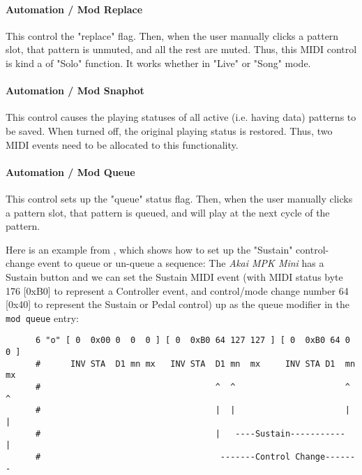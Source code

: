 \paragraph{Automation / Mod Replace}
\label{paragraph:configuration_midi_ctrl_modrep}

   This control the "replace" flag.
   Then, when the user manually clicks a pattern slot,
   that pattern is unmuted, and all the rest are muted.
   Thus, this MIDI control is kind a of "Solo" function.
   It works whether in "Live" or "Song" mode.

\paragraph{Automation / Mod Snaphot}
\label{paragraph:configuration_midi_ctrl_modsnap}

   This control causes the playing statuses of all active
   (i.e. having data) patterns to be saved.  When turned off, the
   original playing status is restored.  Thus, two MIDI events
   need to be allocated to this functionality.

\paragraph{Automation / Mod Queue}
\label{paragraph:configuration_midi_ctrl_modqueue}

   This control sets up the "queue" status flag.
   Then, when the user manually clicks a pattern slot,
   that pattern is queued, and will play at the next cycle of the
   pattern.

   Here is an example from \cite{midicontrol}, which shows how to set up
   the "Sustain" control-change event to queue or un-queue a sequence:
   The \textsl{Akai MPK Mini} has a Sustain button and we can set the
   Sustain MIDI event (with MIDI status byte 176 [0xB0] to represent a
   Controller event, and control/mode change number 64 [0x40] to
   represent the Sustain or Pedal control) up as the queue modifier in
   the \texttt{mod queue} entry:

   \begin{verbatim}
      6 "o" [ 0  0x00 0  0  0 ] [ 0  0xB0 64 127 127 ] [ 0  0xB0 64 0  0 ]
      #      INV STA  D1 mn mx   INV STA  D1 mn  mx     INV STA D1  mn mx
      #                                   ^  ^                      ^  ^
      #                                   |  |                      |  |
      #                                   |   ----Sustain-----------   |
      #                                    -------Control Change-------
   \end{verbatim}

